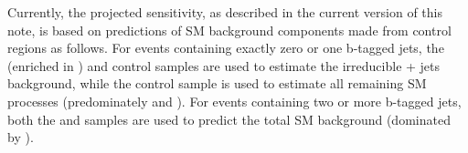 {Currently, the projected sensitivity, as described in the current
version of this note, is based on predictions of SM background
components made from control regions as follows. For events containing
exactly zero or one b-tagged jets, the \ej (enriched in \wej) and \gj
control samples are used to estimate the irreducible \znunu + jets
background, while the \mj control sample is used to estimate all
remaining SM processes (predominately \wj and \ttbar). For events
containing two or more b-tagged jets, both the \mj and \ej samples are
used to predict the total SM background (dominated by \ttbar).

}

